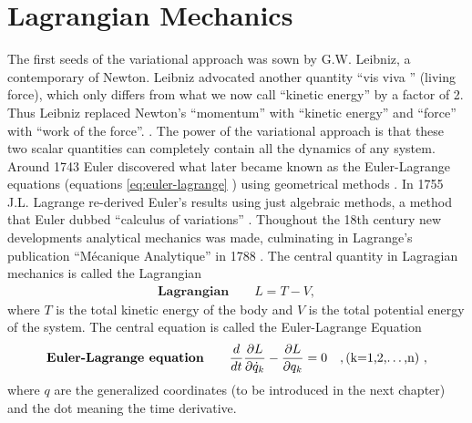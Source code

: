 \section{Lagrangian Mechanics}
The first seeds of the variational approach was sown by G.W. Leibniz, a contemporary of Newton. Leibniz advocated another quantity ``vis viva '' (living force), which only differs from what we now call ``kinetic energy'' by a factor of 2. Thus Leibniz replaced Newton's ``momentum'' with ``kinetic energy'' and ``force'' with ``work of the force''. \cite[p. xxi]{Lanczos1970}. The power of the variational approach is that these two scalar quantities can completely contain all the dynamics of any system. Around 1743 Euler discovered what later became known as the Euler-Lagrange equations (equations \eqref{eq:euler-lagrange} \cite[p. 61]{Lanczos1970}) using geometrical methods \cite[p. 67]{Goldstine1980} \cite{stack-euler-lagrange}. In 1755 J.L. Lagrange re-derived Euler's results using just algebraic methods, a method that Euler dubbed ``calculus of variations'' \cite[p. xiv]{Goldstine1980} \cite{stack-euler-lagrange}. Thoughout the 18th century new developments analytical mechanics was made, culminating in Lagrange's publication ``Mécanique Analytique'' in 1788 \cite[p. 197]{Fraser1983}. The central quantity in Lagragian mechanics is called the Lagrangian \cite[p. 3]{Hjorth2015}
\begin{align}
\label{eq:lagrangian}
\textbf{Lagrangian} \qquad L = T - V,
\end{align}
where $T$ is the total kinetic energy of the body and $V$ is the total potential energy of the system. The central equation is called the Euler-Lagrange Equation \cite{Hjorth2015}
\begin{align}
\label{eq:euler-lagrange}
\textbf{Euler-Lagrange equation} \qquad \dfrac{d}{dt} \dfrac{\partial L}{\partial \dot{q}_k} - \dfrac{\partial L}{\partial q_k} = 0 \quad ,\text{(k=1,2,\dots,n)}\ ,
\end{align}
where $q$ are the generalized coordinates (to be introduced in the next chapter) and the dot meaning the time derivative.


